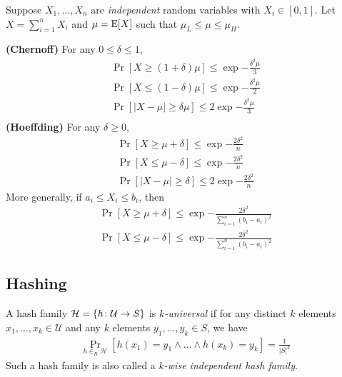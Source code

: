 \documentclass{article}
\begin{document}
\begin{lemma}
  Suppose $X_1, \ldots, X_n$ are \emph{independent} random variables with $X_i \in [0, 1]$.
  Let $X = \sum_{i=1}^n X_i$ and $\mu = \operatorname{E}[X]$ such that $\mu_L \leq \mu \leq \mu_H$.

\textbf{(Chernoff)} For any $0 \leq \delta \leq 1$,
  \begin{align}
    \Pr[X \geq (1 + \delta)\mu] \le \exp{-\frac{\delta^2\mu}{3}}
    \\
    \Pr[X \leq (1 - \delta)\mu] \le \exp{-\frac{\delta^2\mu}{2}}
    \\
    \Pr \left[ |X - \mu| \geq \delta \mu \right] \le 2 \exp{-\frac{\delta^2\mu}{3}}
    \\
  \end{align}
\textbf{(Hoeffding)} For any $\delta \geq 0$,
  \begin{align}
    \Pr[X \geq \mu + \delta] \le \exp{-\frac{2\delta^2}{n}}
    \\
    \Pr[X \leq \mu - \delta] \le \exp{-\frac{2\delta^2}{n}}
    \\
    \Pr \left[ |X - \mu| \geq \delta \right] \le 2 \exp{-\frac{2\delta^2}{n}}
  \end{align}
  More generally, if $a_i \leq X_i \leq b_i$, then
  \begin{align}
    \Pr[X \geq \mu + \delta] \le \exp{-\frac{2\delta^2}{\sum_{i=1}^n (b_i - a_i)^2}}
    \\
    \Pr[X \leq \mu - \delta] \le \exp{-\frac{2\delta^2}{\sum_{i=1}^n (b_i - a_i)^2}}
  \end{align}
\end{lemma}

\subsection{Hashing}

\begin{definition}
  A hash family $\mathcal{H} = \{h \colon \mathcal{U} \to S\}$ is \emph{$k$-universal} if for any distinct $k$ elements $x_1, \ldots, x_k \in \mathcal{U}$ and any $k$ elements $y_1, \ldots, y_k \in S$, we have
  \begin{align}
    \Pr_{h \in_R \mathcal{H}}[h(x_1) = y_1 \land \ldots \land h(x_k) = y_k] = \frac{1}{|S|^k}
  \end{align}
Such a hash family is also called a \emph{$k$-wise independent hash family}.
\end{definition}
\end{document}
